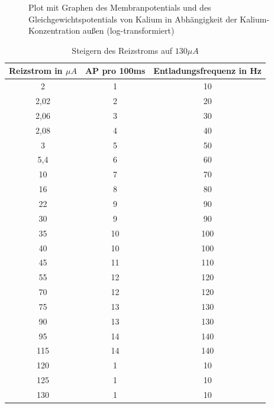 \documentclass[11pt]{article}
\begin{document}
\begin{figure}[H]
\caption{Plot mit Graphen des Membranpotentials und des Gleichgewichtspotentials von Kalium in Abhängigkeit der Kalium-Konzentration außen (log-transformiert)}
\label{plot}
\end{figure}





\begin{table}[H]
\caption{Steigern des Reizstroms auf $130 \mu A$}
\begin{center}
\begin{tabular}{c|c|c}
Reizstrom in $\mu A$ & AP pro 100ms & Entladungsfrequenz in Hz \\
\hline\hline
2	&	1	&	10	\\
2,02	&	2	&	20	\\
2,06	&	3	&	30	\\
2,08	&	4	&	40	\\
3	&	5	&	50	\\
5,4	&	6	&	60	\\
10	&	7	&	70	\\
16	&	8	&	80	\\
22	&	9	&	90	\\
30	&	9	&	90	\\
35	&	10	&	100	\\
40	&	10	&	100	\\
45	&	11	&	110	\\
55	&	12	&	120	\\
70	&	12	&	120	\\
75	&	13	&	130	\\
90	&	13	&	130	\\
95	&	14	&	140	\\
115	&	14	&	140	\\
120	&	1	&	10	\\
125	&	1	&	10	\\
130	&	1	&	10	
\end{tabular}
\end{center}
\label{werte}
\end{table}
\end{document}
